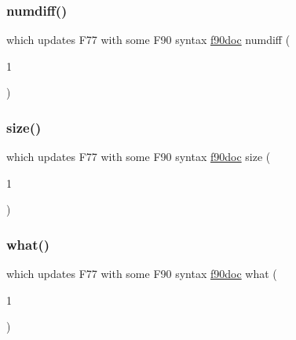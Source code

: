 \mbox{\label{what__overview_81_8txt_a7d9f0f7f68d767709cf298ae59490237}} 
\subsubsection{\texorpdfstring{numdiff()}{numdiff()}}
{\footnotesize\ttfamily which updates F77 with some F90 syntax \hyperlink{what__overview_81_8txt_aab2f56fdcdfab484c0d861985675a92f}{f90doc} numdiff (\begin{DoxyParamCaption}\item[{1}]{ }\end{DoxyParamCaption})}

\mbox{\label{what__overview_81_8txt_ab5692ed87074f1d5ec850a9ffa8b5af9}} 
\subsubsection{\texorpdfstring{size()}{size()}}
{\footnotesize\ttfamily which updates F77 with some F90 syntax \hyperlink{what__overview_81_8txt_aab2f56fdcdfab484c0d861985675a92f}{f90doc} size (\begin{DoxyParamCaption}\item[{1}]{ }\end{DoxyParamCaption})}

\mbox{\label{what__overview_81_8txt_a8cdf8efd1b900d6dce77a3f97edb2216}} 
\subsubsection{\texorpdfstring{what()}{what()}}
{\footnotesize\ttfamily which updates F77 with some F90 syntax \hyperlink{what__overview_81_8txt_aab2f56fdcdfab484c0d861985675a92f}{f90doc} what (\begin{DoxyParamCaption}\item[{1}]{ }\end{DoxyParamCaption})\hspace{0.3cm}{\ttfamily [new]}}



